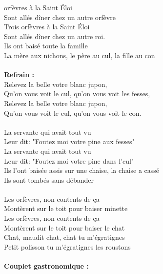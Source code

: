 \vspace{-0.3cm}
 orfèvres à la Saint \'Eloi
\\Sont allés dîner chez un autre orfèvre
\\Trois orfèvres à la Saint \'Eloi
\\Sont allés dîner chez un autre roi.
\\Ils ont baisé toute la famille
\\La mère aux nichons, le père au cul, la fille au con
\\\\\textbf{Refrain :}
\\Relevez la belle votre blanc jupon,
\\Qu'on vous voit le cul, qu'on vous voit les fesses,
\\Relevez la belle votre blanc jupon,
\\Qu'on vous voit le cul, qu'on vous voit le con.
\\\\La servante qui avait tout vu
\\Leur dit: "Foutez moi votre pine aux fesses"
\\La servante qui avait tout vu
\\Leur dit: "Foutez moi votre pine dans l'cul"
\\Ils l'ont baisée assis sur une chaise, la chaise a cassé
\\Ils sont tombés sans débander
\\\\Les orfèvres, non contents de ça
\\Montèrent sur le toit pour baiser minette
\\Les orfèvres, non contents de ça
\\Montèrent sur le toit pour baiser le chat
\\Chat, maudit chat, chat tu m'égratignes
\\Petit polisson tu m'égratignes les roustons
\\\\\textbf{Couplet gastronomique :}
